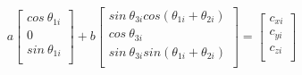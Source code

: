         \begin{equation}
                 a \left[ \begin{matrix}
                cos~ \theta _{1i}\\
                0\\
                sin~ \theta _{1i}\\
                \end{matrix}
                 \right] +b \left[ \begin{matrix}
                sin~ \theta _{3i}cos⁡ \left(  \theta _{1i}+ \theta _{2i} \right) \\
                cos~ \theta _{3i}\\
                sin~ \theta _{3i}sin \left(  \theta _{1i}+ \theta _{2i} \right) \\
                \end{matrix}
                 \right] = \left[ \begin{matrix}
                c_{xi}\\
                c_{yi}\\
                c_{zi}\\
                \end{matrix} \right] 
                \label{eq:modelacion_cine_vel_metodoa_anexo_2}
        \end{equation}
        
